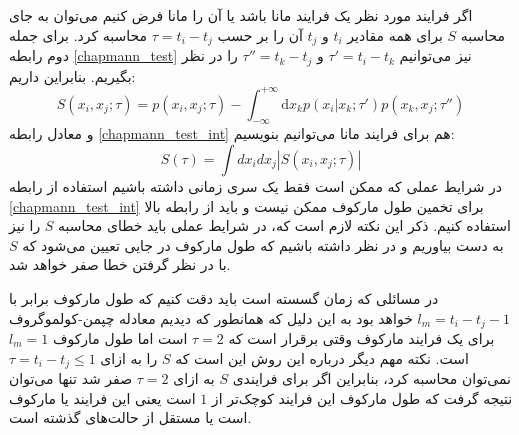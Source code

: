 اگر فرایند مورد نظر یک فرایند مانا باشد یا آن را مانا فرض کنیم می‌توان به جای محاسبه $S$ برای همه 
مقادیر $t_{i}$ و $t_{j}$ آن را بر حسب $\tau = t_{i} - t_{j}$ محاسبه کرد. 
برای جمله دوم رابطه \ref{chapmann_test} نیز می‌توانیم $\tau' = t_i - t_k$ و $\tau'' = t_k - t_j$ 
را در نظر بگیریم. بنابراین داریم:
\begin{equation}
  S ( x_i, x_j; \tau ) = p (x_{i},x_{j}; \tau ) - \int_{-\infty}^{+\infty} \mathrm{d} x_k p(x_{i}|x_k;\tau') p(x_k, x_{j};\tau'')
  \label{chapmann_test)stationary}
\end{equation}
و معادل رابطه \ref{chapmann_test_int} هم برای فرایند مانا می‌توانیم بنویسیم:
\begin{equation}
  S\left( \tau \right) = \int dx_i dx_j \left| S ( x_i, x_j; \tau ) \right|
  \label{chapmann_test_int_stationary}
\end{equation}
در شرایط عملی که ممکن 
است فقط یک سری زمانی داشته باشیم استفاده از رابطه \ref{chapmann_test_int} برای تخمین 
طول مارکوف ممکن نیست و باید از رابطه بالا استفاده کنیم.
ذکر این نکته لازم است که، در شرایط عملی باید خطای محاسبه $S$ را نیز به دست بیاوریم و در نظر داشته 
باشیم که طول مارکوف در جایی تعیین می‌شود که $S$ با در نظر گرفتن خطا صفر خواهد شد.\cite{friedrich_approaching_2011}

در مسائلی که زمان گسسته است باید دقت کنیم که طول مارکوف برابر با $l_m=t_i - t_j - 1$ خواهد بود 
به این دلیل که همانطور که دیدیم معادله چپمن-کولموگروف برای یک فرایند مارکوف وقتی برقرار است 
که $\tau=2$ است اما طول مارکوف $l_m=1$ است. 
نکته مهم دیگر درباره این 
روش این است که $S$ را به ازای $\tau = t_i - t_j \leq 1$ نمی‌توان محاسبه کرد، بنابراین اگر برای فرایندی $S$ به ازای 
$\tau = 2$ صفر شد تنها می‌توان نتیجه گرفت که طول مارکوف این فرایند کوچک‌تر از $1$ است یعنی این فرایند یا مارکوف است یا مستقل از حالت‌های گذشته است.

